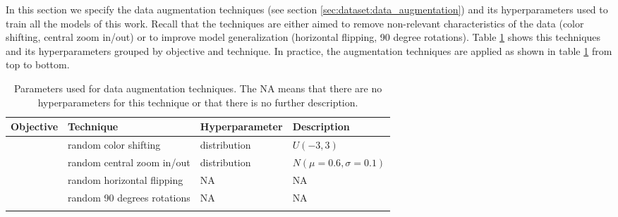 In this section we specify the data augmentation techniques (see section \ref{sec:dataset:data_augmentation}) and its hyperparameters used to train all the models of this work. Recall that the techniques are either aimed to remove non-relevant characteristics of the data (color shifting, central zoom in/out) or to improve model generalization (horizontal flipping, 90 degree rotations). Table \ref{table:methodology:dataset:augm} shows this techniques and its hyperparameters grouped by objective and technique. In practice, the augmentation techniques are applied as shown in table \ref{table:methodology:dataset:augm} from top to bottom.

\setlength{\mylinewidth}{\linewidth-7pt}%
\setlength{\mylengtha}{0.2\mylinewidth-2\arraycolsep}%
\setlength{\mylengthb}{0.2\mylinewidth-2\arraycolsep}%
\setlength{\mylengthc}{0.25\mylinewidth-2\arraycolsep}%
\setlength{\mylengthd}{0.22\mylinewidth-2\arraycolsep}%

\begin{longtable}{>{\centering\arraybackslash}m{\mylengtha} | >{\centering\arraybackslash}m{\mylengthb} | >{\centering\arraybackslash}m{\mylengthc} | >{\centering\arraybackslash}m{\mylengthd}}
    \hline
    Objective & Technique & Hyperparameter & Description \\
    \hline
    \multirow{2}{\mylengtha}{\centering Remove non-relevant features} & random color shifting & distribution & $U(-3,3)$ \\
    \cline{2-4}
     & random central zoom in/out & distribution\footnotemark & $N(\mu=0.6, \sigma=0.1)$ \\
    \hline
     \multirow{2}{\mylengtha}{\centering Improve generalization} & random horizontal flipping & NA & NA \\
    \cline{2-4}
     & random 90 degrees rotations & NA & NA \\
    \hline
  \caption{Parameters used for data augmentation techniques. The NA means that there are no hyperparameters for this technique or that there is no further description.}
  \label{table:methodology:dataset:augm}
\end{longtable}


